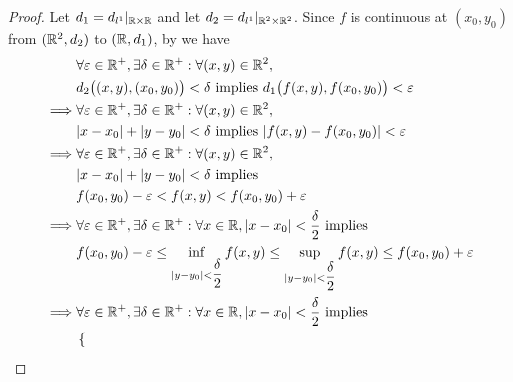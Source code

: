 \begin{proof}
  Let \(d_1 = d_{l^1}|_{\mathbb{R} \times \mathbb{R}}\) and let \(d_2 = d_{l^1}|_{\mathbb{R}^2 \times \mathbb{R}^2}\).
  Since \(f\) is continuous at \((x_0, y_0)\) from \((\mathbb{R}^2, d_2)\) to \((\mathbb{R}, d_1)\), by  we have
  \begin{align*}
             & \forall \varepsilon \in \R^+, \exists \delta \in \R^+ : \forall (x, y) \in \R^2,                                                                                     \\
             & d_2\big((x, y), (x_0, y_0)\big) < \delta \text{ implies } d_1\big(f(x, y), f(x_0, y_0)\big) < \varepsilon                                                            \\
    \implies & \forall \varepsilon \in \R^+, \exists \delta \in \R^+ : \forall (x, y) \in \R^2,                                                                                     \\
             & \abs{x - x_0} + \abs{y - y_0} < \delta \text{ implies } \abs{f(x, y) - f(x_0, y_0)} < \varepsilon                                                                    \\
    \implies & \forall \varepsilon \in \R^+, \exists \delta \in \R^+ : \forall (x, y) \in \R^2,                                                                                     \\
             & \abs{x - x_0} + \abs{y - y_0} < \delta \text{ implies}                                                                                                               \\
             & f(x_0, y_0) - \varepsilon < f(x, y) < f(x_0, y_0) + \varepsilon                                                                                                      \\
    \implies & \forall \varepsilon \in \R^+, \exists \delta \in \R^+ : \forall x \in \R, \abs{x - x_0} < \dfrac{\delta}{2} \text{ implies}                                          \\
             & f(x_0, y_0) - \varepsilon \leq \inf_{\abs{y - y_0} < \dfrac{\delta}{2}} f(x, y) \leq \sup_{\abs{y - y_0} < \dfrac{\delta}{2}} f(x, y) \leq f(x_0, y_0) + \varepsilon \\
    \implies & \forall \varepsilon \in \R^+, \exists \delta \in \R^+ : \forall x \in \R, \abs{x - x_0} < \dfrac{\delta}{2} \text{ implies}                                          \\
             & \begin{dcases}

\end{dcases}
\end{align*}
\end{proof}
